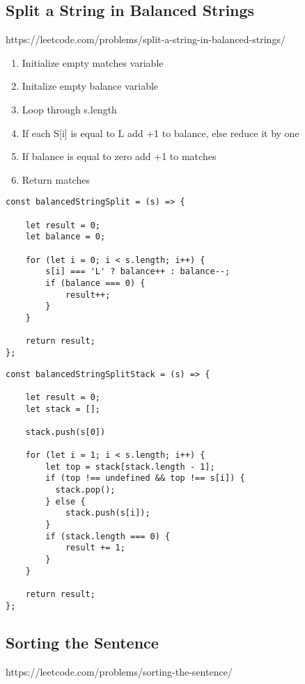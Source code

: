 \documentclass[10pt]{article}
\begin{document}
\pagebreak %
\medskip 
\subsection{Split a String in Balanced Strings}
https://leetcode.com/problems/split-a-string-in-balanced-strings/

\begin{enumerate}
	\item Initialize empty matches variable
	\item Initalize empty balance variable
	\item Loop through s.length
	\item If each S[i] is equal to L add +1 to balance, else reduce it by one
	\item If balance is equal to zero add +1 to matches 
	\item Return matches 
\end{enumerate}

\begin{lstlisting}[title=Solution balancedStringSplit with balance counter, captionpos=t]
const balancedStringSplit = (s) => {
    
    let result = 0;
    let balance = 0;

    for (let i = 0; i < s.length; i++) {
        s[i] === 'L' ? balance++ : balance--;
        if (balance === 0) {
            result++;
        }
    }

    return result;
};
\end{lstlisting}

\begin{lstlisting}[title=Solution balancedStringSplit with stack, captionpos=t]
const balancedStringSplitStack = (s) => {

    let result = 0;
    let stack = [];

    stack.push(s[0])

    for (let i = 1; i < s.length; i++) {
        let top = stack[stack.length - 1];
        if (top !== undefined && top !== s[i]) {
          stack.pop();
        } else {
            stack.push(s[i]);
        }
        if (stack.length === 0) {
            result += 1;
        }
    }

    return result;
};
\end{lstlisting}
\medskip %



\pagebreak %
\medskip 
\subsection{Sorting the Sentence}
https://leetcode.com/problems/sorting-the-sentence/
\end{document}
